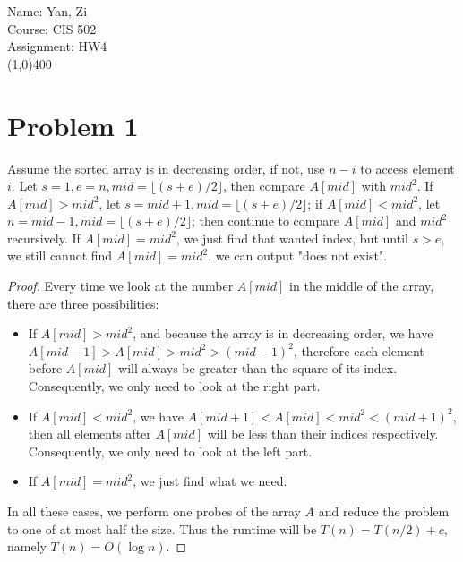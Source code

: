 \documentclass[letter,12pt]{article}
\begin{document}
Name: Yan, Zi \\
Course: CIS 502 \\
Assignment: HW4 \\
\line(1,0){400}

\section*{Problem 1}
Assume the sorted array is in decreasing order, if not, use $n-i$ to access
element $i$. Let $s = 1, e = n, 
mid=\lfloor (s+e)/2 \rfloor$, then compare $A[mid]$ with $mid^2$.
If $A[mid] > mid^2$, let $s = mid +1, mid = \lfloor (s+e)/2 \rfloor$;
if $A[mid] < mid^2$, let $n = mid - 1, mid = \lfloor (s+e)/2 \rfloor$;
then continue to compare $A[mid]$ and $mid^2$ recursively.
If $A[mid] = mid^2$, we just find that wanted index, but until $s > e$,
we still cannot find $A[mid] = mid^2$, we can output "does not exist".

\begin{proof}
Every time we look at the number $A[mid]$ in the middle of the array,
there are three possibilities:
\begin{itemize}
    \item If $A[mid] > mid^2$, and because the array is in decreasing
    order, we have $A[mid-1] > A[mid] > mid^2 > (mid-1)^2$, therefore
    each element before $A[mid]$ will always be greater than the square of
    its index. Consequently, we only need to look at the right part.
    \item If $A[mid] < mid ^2$, we have $A[mid+1]<A[mid]<mid^2<
    (mid+1)^2$, then all elements after $A[mid]$ will be less than their
    indices respectively. Consequently, we only need to look at the left part.
    \item If $A[mid] = mid^2$, we just find what we need.
\end{itemize}
In all these cases, we perform one probes of the array $A$ and reduce
the problem to one of at most half the size. Thus the runtime will be
$T(n) = T(n/2) + c$, namely $T(n) = O(\log n)$.
\end{proof}
\end{document}

